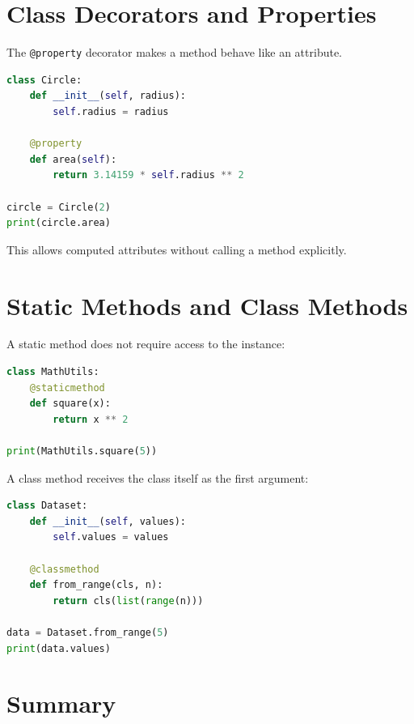 \documentclass[12pt,oneside]{book}
\numberwithin{equation}{section}
\theoremstyle{definition}
\theoremstyle{plain}
\theoremstyle{remark}
\begin{document}
\section{Class Decorators and Properties}

The \texttt{@property} decorator makes a method behave like an attribute.

\begin{lstlisting}[language=Python]
class Circle:
    def __init__(self, radius):
        self.radius = radius

    @property
    def area(self):
        return 3.14159 * self.radius ** 2

circle = Circle(2)
print(circle.area)
\end{lstlisting}

This allows computed attributes without calling a method explicitly.

\section{Static Methods and Class Methods}

A static method does not require access to the instance:
\begin{lstlisting}[language=Python]
class MathUtils:
    @staticmethod
    def square(x):
        return x ** 2

print(MathUtils.square(5))
\end{lstlisting}

A class method receives the class itself as the first argument:
\begin{lstlisting}[language=Python]
class Dataset:
    def __init__(self, values):
        self.values = values

    @classmethod
    def from_range(cls, n):
        return cls(list(range(n)))

data = Dataset.from_range(5)
print(data.values)
\end{lstlisting}

\section{Summary}
\end{document}
